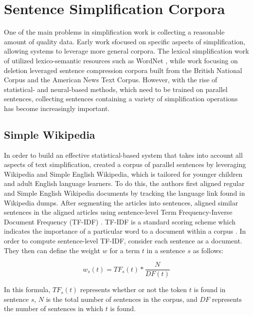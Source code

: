 \documentclass[thesis.tex]{subfiles}
\begin{document}
\section{Sentence Simplification Corpora} \label{sec:data_review}

One of the main problems in simplification work is collecting a reasonable amount of quality data. Early work sfocused on specific aspects of simplification, allowing systems to leverage more general corpora. The lexical simplification work of \cite{carroll1999simplifying} utilized lexico-semantic resources such as WordNet \citep{miller1992wordnet}, while work focusing on deletion \citep{filippova2008dependency} leveraged sentence compression corpora built from the British National Corpus and the American News Text Corpus. However, with the rise of statistical- and neural-based methods, which need to be trained on parallel sentences, collecting sentences containing a variety of simplification operations has become increasingly important.

\subsection{Simple Wikipedia} \label{pwkp}

In order to build an effective statistical-based system that takes into account all aspects of text simplification, \cite{zhu2010monolingual} created a corpus of parallel sentences by leveraging Wikipedia and Simple English Wikipedia, which is tailored for younger children and adult English language learners. To do this, the authors first aligned regular and Simple English Wikipedia documents by tracking the language link found in Wikipedia dumps. After segmenting the articles into sentences, \cite{zhu2010monolingual} aligned similar sentences in the aligned articles using sentence-level Term Frequency-Inverse Document Frequency (TF-IDF) \citep{nelken2006towards}. TF-IDF is a standard scoring scheme which indicates the importance of a particular word to a document within a corpus \citep{Salton1988term}. In order to compute sentence-level TF-IDF, \cite{nelken2006towards} consider each sentence as a document. They then can define the weight $w$ for a term $t$ in a sentence $s$ as follows:

\begin{equation}
    w_s(t) = TF_s(t) * \frac{N}{DF(t)}
\end{equation}

In this formula, $TF_s(t)$ represents whether or not the token $t$ is found in sentence $s$, $N$ is the total number of sentences in the corpus, and $DF$ represents the number of sentences in which $t$ is found.
\end{document}
